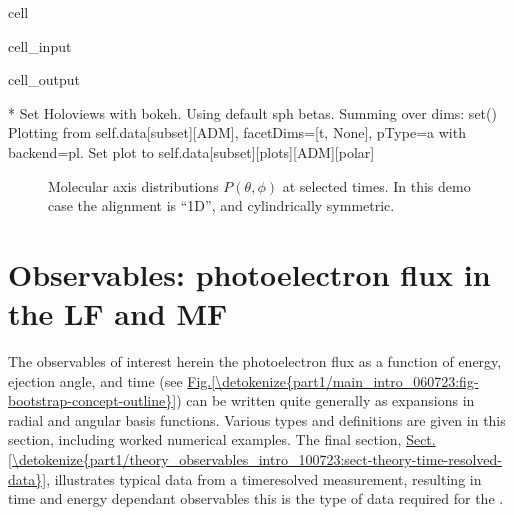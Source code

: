 \documentclass[letterpaper,table,10pt,english]{jupyterBook}
\begin{document}
\begin{sphinxuseclass}{cell}
\begin{sphinxVerbatimInput}
\begin{sphinxuseclass}{cell_input}
\end{sphinxuseclass}\end{sphinxVerbatimInput}
\begin{sphinxVerbatimOutput}

\begin{sphinxuseclass}{cell_output}
\begin{sphinxVerbatim}[commandchars=\\\{\}]
* Set Holoviews with bokeh.
Using default sph betas.
Summing over dims: set()
Plotting from self.data[subset][ADM], facetDims=[\PYGZsq{}t\PYGZsq{}, None], pType=a with backend=pl.
Set plot to self.data[\PYGZsq{}subset\PYGZsq{}][\PYGZsq{}plots\PYGZsq{}][\PYGZsq{}ADM\PYGZsq{}][\PYGZsq{}polar\PYGZsq{}]
\end{sphinxVerbatim}

\end{sphinxuseclass}\end{sphinxVerbatimOutput}

\end{sphinxuseclass}
\begin{figure}[htbp]
\centering
\capstart

\noindent{}
\caption{Molecular axis distributions \(P(\theta,\phi)\) at selected times. In this demo case the alignment is “1D”, and cylindrically symmetric.}\label{\detokenize{part1/theory_molecular_alignment_170723:fig-axisdistdemo}}\end{figure}

\sphinxstepscope


\section{Observables: photoelectron flux in the LF and MF}
\label{\detokenize{part1/theory_observables_intro_100723:observables-photoelectron-flux-in-the-lf-and-mf}}\label{\detokenize{part1/theory_observables_intro_100723:sect-theory-observables}}\label{\detokenize{part1/theory_observables_intro_100723::doc}}
\sphinxAtStartPar
The observables of interest herein \sphinxhyphen{} the photoelectron flux as a function of energy, ejection angle, and time (see \hyperref[\detokenize{part1/main_intro_060723:fig-bootstrap-concept-outline}]{Fig.\@ \ref{\detokenize{part1/main_intro_060723:fig-bootstrap-concept-outline}}}) \sphinxhyphen{} can be written quite generally as expansions in radial and angular basis functions. Various types and definitions are given in this section, including worked numerical examples. The final section, \hyperref[\detokenize{part1/theory_observables_intro_100723:sect-theory-time-resolved-data}]{Sect.\@ \ref{\detokenize{part1/theory_observables_intro_100723:sect-theory-time-resolved-data}}}, illustrates typical data from a time\sphinxhyphen{}resolved measurement, resulting in time and energy dependant observables \sphinxhyphen{} this is the type of data required for the {\hyperref[\detokenize{backmatter/glossary:term-bootstrap-retrieval-protocol}]{}}.
\end{document}
